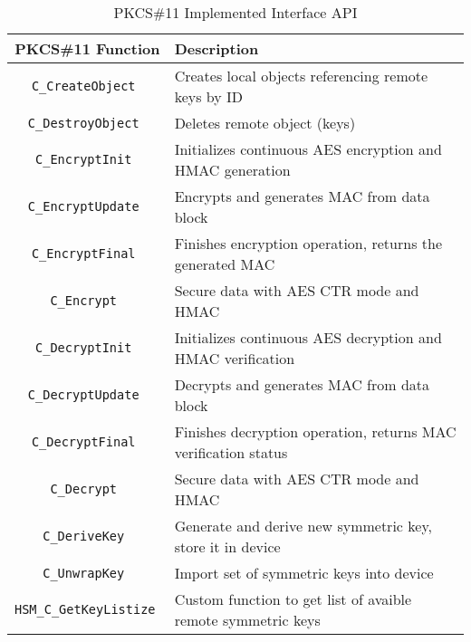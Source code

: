 \begin{table}[]
\centering
\def\arraystretch{1.5}
\begin{tabular}{|c|l|}
	\hline
	\textbf{PKCS\#11 Function} & \textbf{Description} \\ \hline
	\texttt{C\_CreateObject 	}& Creates local objects referencing remote keys by ID \\ \hline
	\texttt{C\_DestroyObject	}& Deletes remote object (keys)\\ \hline
	\texttt{C\_EncryptInit  	}& Initializes continuous AES encryption and HMAC generation \\ \hline
	\texttt{C\_EncryptUpdate  	}& Encrypts and generates MAC from data block \\ \hline
	\texttt{C\_EncryptFinal  	}& Finishes encryption operation, returns the generated MAC\\ \hline
	\texttt{C\_Encrypt      	}& Secure data with AES CTR mode and HMAC\\ \hline
	\texttt{C\_DecryptInit  	}& Initializes continuous AES decryption and HMAC verification\\ \hline
	\texttt{C\_DecryptUpdate  	}& Decrypts and generates MAC from data block\\ \hline
	\texttt{C\_DecryptFinal  	}& Finishes decryption operation, returns MAC verification status\\ \hline
	\texttt{C\_Decrypt      	}& Secure data with AES CTR mode and HMAC\\ \hline
	\texttt{C\_DeriveKey		}& Generate and derive new symmetric key, store it in device \\ \hline
	\texttt{C\_UnwrapKey		}& Import set of symmetric keys into device\\ \hline
	\texttt{HSM\_C\_GetKeyListize	}& Custom function to get list of avaible remote symmetric keys\\ \hline
\end{tabular}
\caption{PKCS\#11 Implemented Interface API}
\label{tab:pkcs11-api}
\end{table}
